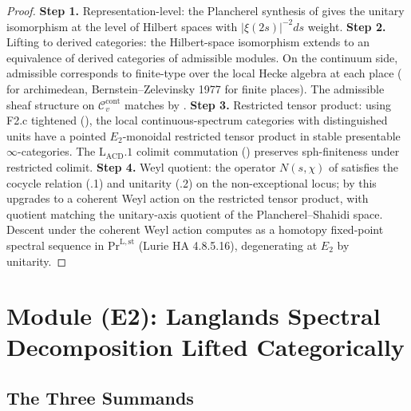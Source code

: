 \begin{proof}
\textbf{Step 1.} Representation-level: the Plancherel synthesis of
 gives the unitary isomorphism at
the level of Hilbert spaces with \(|\xi(2s)|^{-2}ds\) weight.
\textbf{Step 2.} Lifting to derived categories: the Hilbert-space
isomorphism extends to an equivalence of derived categories of
admissible modules. On the continuum side, admissible corresponds to
finite-type over the local Hecke algebra at each place
( for archimedean,
Bernstein--Zelevinsky 1977 for finite places). The admissible sheaf
structure on \(\mathcal{C}^{\mathrm{cont}}_{v}\) matches by
.
\textbf{Step 3.} Restricted tensor product: using F2.c tightened
(), the local continuous-spectrum
categories with distinguished units have a pointed \(E_{2}\)-monoidal
restricted tensor product in stable presentable \(\infty\)-categories. The
\(\mathrm{L}_{\mathrm{ACD}}.1\) colimit commutation
() preserves sph-finiteness under
restricted colimit.
\textbf{Step 4.} Weyl quotient: the operator \(N(s,\chi)\) of
 satisfies the cocycle relation
(.1) and unitarity
(.2) on the non-exceptional
locus; by  this upgrades to
a coherent Weyl action on the restricted tensor product, with
quotient matching the unitary-axis quotient of the Plancherel--Shahidi
space. Descent under the coherent Weyl action computes as a homotopy
fixed-point spectral sequence in \(\mathrm{Pr}^{\mathrm{L,st}}\)
(Lurie HA 4.8.5.16), degenerating at \(E_{2}\) by unitarity.
\end{proof}

\section{Module (E2): Langlands Spectral Decomposition Lifted Categorically}
\label{v4-arith:w6-d:E2}

\subsection{The Three Summands}

